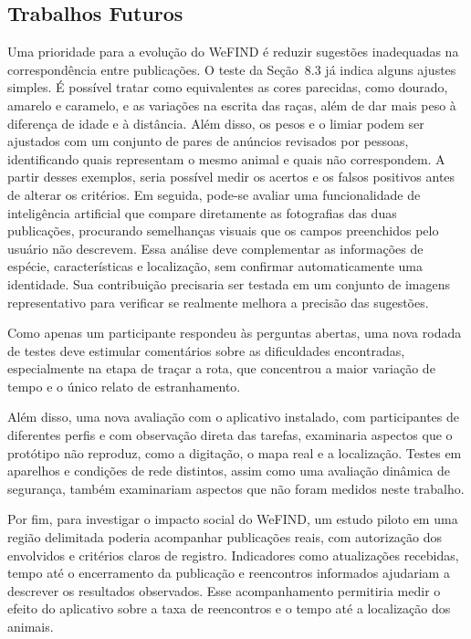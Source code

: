 \subsection{Trabalhos Futuros}

Uma prioridade para a evolução do WeFIND é reduzir sugestões inadequadas na correspondência entre publicações. O teste da Seção~8.3 já indica alguns ajustes simples. É possível tratar como equivalentes as cores parecidas, como dourado, amarelo e caramelo, e as variações na escrita das raças, além de dar mais peso à diferença de idade e à distância. Além disso, os pesos e o limiar podem ser ajustados com um conjunto de pares de anúncios revisados por pessoas, identificando quais representam o mesmo animal e quais não correspondem. A partir desses exemplos, seria possível medir os acertos e os falsos positivos antes de alterar os critérios. Em seguida, pode-se avaliar uma funcionalidade de inteligência artificial que compare diretamente as fotografias das duas publicações, procurando semelhanças visuais que os campos preenchidos pelo usuário não descrevem. Essa análise deve complementar as informações de espécie, características e localização, sem confirmar automaticamente uma identidade. Sua contribuição precisaria ser testada em um conjunto de imagens representativo para verificar se realmente melhora a precisão das sugestões.

Como apenas um participante respondeu às perguntas abertas, uma nova rodada de testes deve estimular comentários sobre as dificuldades encontradas, especialmente na etapa de traçar a rota, que concentrou a maior variação de tempo e o único relato de estranhamento.

Além disso, uma nova avaliação com o aplicativo instalado, com participantes de diferentes perfis e com observação direta das tarefas, examinaria aspectos que o protótipo não reproduz, como a digitação, o mapa real e a localização. Testes em aparelhos e condições de rede distintos, assim como uma avaliação dinâmica de segurança, também examinariam aspectos que não foram medidos neste trabalho.

Por fim, para investigar o impacto social do WeFIND, um estudo piloto em uma região delimitada poderia acompanhar publicações reais, com autorização dos envolvidos e critérios claros de registro. Indicadores como atualizações recebidas, tempo até o encerramento da publicação e reencontros informados ajudariam a descrever os resultados observados. Esse acompanhamento permitiria medir o efeito do aplicativo sobre a taxa de reencontros e o tempo até a localização dos animais.
